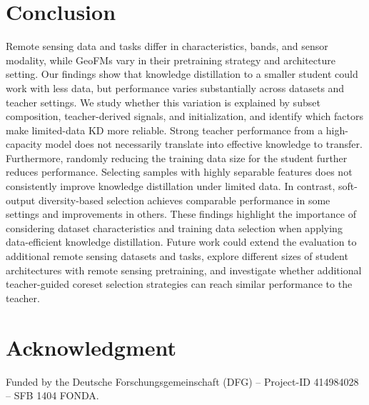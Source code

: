 \documentclass[conference]{IEEEtran}
\begin{document}
\section{Conclusion}

Remote sensing data and tasks differ in characteristics, bands, and sensor modality, while GeoFMs vary in their pretraining strategy and architecture setting.
Our findings show that knowledge distillation to a smaller student could work with less data, but performance varies substantially across datasets and teacher settings.
We study whether this variation is explained by subset composition, teacher-derived signals, and initialization, and identify which factors make limited-data KD more reliable.
Strong teacher performance from a high-capacity model does not necessarily translate into effective knowledge to transfer.
Furthermore, randomly reducing the training data size for the student further reduces performance.
Selecting samples with highly separable features does not consistently improve knowledge distillation under limited data.
In contrast, soft-output diversity-based selection achieves comparable performance in some settings and improvements in others.
These findings highlight the importance of considering dataset characteristics and training data selection when applying data-efficient knowledge distillation.
Future work could extend the evaluation to additional remote sensing datasets and tasks, explore different sizes of student architectures with remote sensing pretraining, and investigate whether additional teacher-guided coreset selection strategies can reach similar performance to the teacher.

\section{Acknowledgment}
Funded by the Deutsche Forschungsgemeinschaft (DFG) – Project-ID 414984028 – SFB 1404 FONDA.


\end{document}
